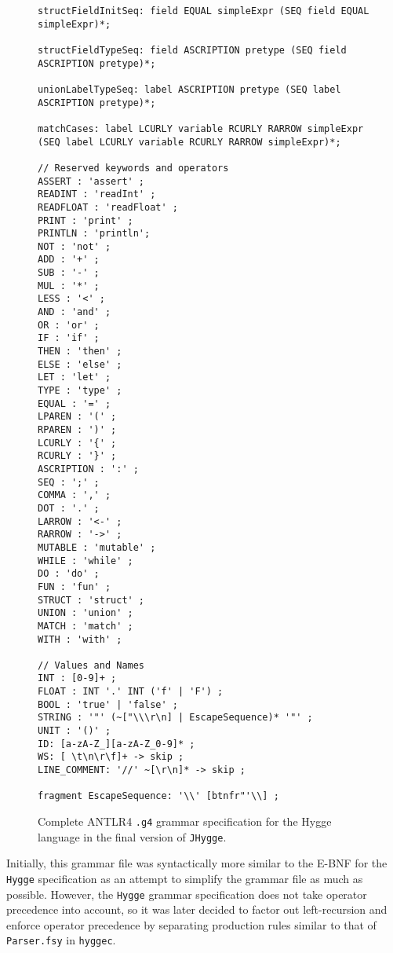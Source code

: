 \begin{figure}[H]
\begin{lstlisting}
structFieldInitSeq: field EQUAL simpleExpr (SEQ field EQUAL simpleExpr)*;

structFieldTypeSeq: field ASCRIPTION pretype (SEQ field ASCRIPTION pretype)*;

unionLabelTypeSeq: label ASCRIPTION pretype (SEQ label ASCRIPTION pretype)*;

matchCases: label LCURLY variable RCURLY RARROW simpleExpr (SEQ label LCURLY variable RCURLY RARROW simpleExpr)*;

// Reserved keywords and operators
ASSERT : 'assert' ;
READINT : 'readInt' ;
READFLOAT : 'readFloat' ;
PRINT : 'print' ;
PRINTLN : 'println';
NOT : 'not' ;
ADD : '+' ;
SUB : '-' ;
MUL : '*' ;
LESS : '<' ;
AND : 'and' ;
OR : 'or' ;
IF : 'if' ;
THEN : 'then' ;
ELSE : 'else' ;
LET : 'let' ;
TYPE : 'type' ;
EQUAL : '=' ;
LPAREN : '(' ;
RPAREN : ')' ;
LCURLY : '{' ;
RCURLY : '}' ;
ASCRIPTION : ':' ;
SEQ : ';' ;
COMMA : ',' ;
DOT : '.' ;
LARROW : '<-' ;
RARROW : '->' ;
MUTABLE : 'mutable' ;
WHILE : 'while' ;
DO : 'do' ;
FUN : 'fun' ;
STRUCT : 'struct' ;
UNION : 'union' ;
MATCH : 'match' ;
WITH : 'with' ;

// Values and Names
INT : [0-9]+ ;
FLOAT : INT '.' INT ('f' | 'F') ;
BOOL : 'true' | 'false' ;
STRING : '"' (~["\\\r\n] | EscapeSequence)* '"' ;
UNIT : '()' ;
ID: [a-zA-Z_][a-zA-Z_0-9]* ;
WS: [ \t\n\r\f]+ -> skip ;
LINE_COMMENT: '//' ~[\r\n]* -> skip ;

fragment EscapeSequence: '\\' [btnfr"'\\] ; 
\end{lstlisting}
\caption{Complete ANTLR4 \texttt{.g4} grammar specification for the Hygge language in the final version of \texttt{JHygge}.}
\label{fig:hygge_grammar_antlr4}
\end{figure}

Initially, this grammar file was syntactically more similar to the E-BNF for the \texttt{Hygge} specification as an attempt to
simplify the grammar file as much as possible. However, the \texttt{Hygge} grammar specification does not take operator
precedence into account, so it was later decided to factor out left-recursion and enforce operator precedence by separating
production rules similar to that of \texttt{Parser.fsy} in \texttt{hyggec}.

